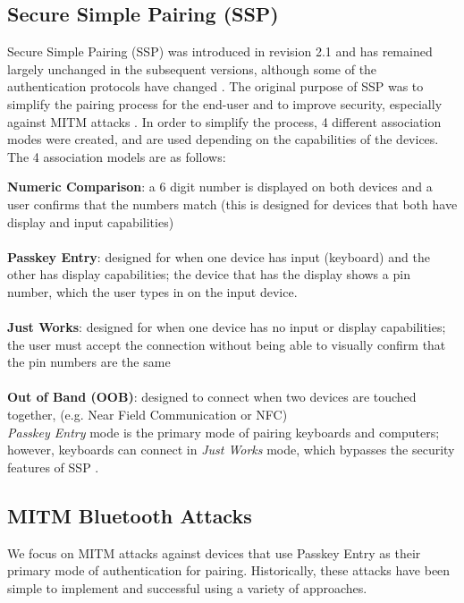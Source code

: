 \documentclass{acm_proc_article-sp}
\begin{document}
\subsection{Secure Simple Pairing (SSP)}
Secure Simple Pairing (SSP) was introduced in revision 2.1 and has remained largely unchanged in the subsequent versions, although some of the authentication protocols have changed \cite{barnickel2012implementing}. The original purpose of SSP was to simplify the pairing process for the end-user and to improve security, especially against MITM attacks \cite{sandhya2012analysis}. In order to simplify the process, 4 different association modes were created, and are used depending on the capabilities of the devices. The 4 association models are as follows:

\textbf{Numeric Comparison}: a 6 digit number is displayed on both devices and a user confirms that the numbers match (this is designed for devices that both have display and input capabilities)\\\\
\textbf{Passkey Entry}: designed for when one device has input (keyboard) and the other has display capabilities; the device that has the display shows a pin number, which the user types in on the input device.\\\\
\textbf{Just Works}: designed for when one device has no input or display capabilities; the user must accept the connection without being able to visually confirm that the pin numbers are the same\\\\
\textbf{Out of Band (OOB)}: designed to connect when two devices are touched together, (e.g. Near Field Communication or NFC)\\

\textit{Passkey Entry} mode is the primary mode of pairing keyboards and computers; however, keyboards can connect in \textit{Just Works} mode, which bypasses the security features of SSP \cite{4401672}.

\subsection{MITM Bluetooth Attacks}
We focus on MITM attacks against devices that use Passkey Entry as their primary mode of authentication for pairing. Historically, these attacks have been simple to implement and successful using a variety of approaches.  
\end{document}
